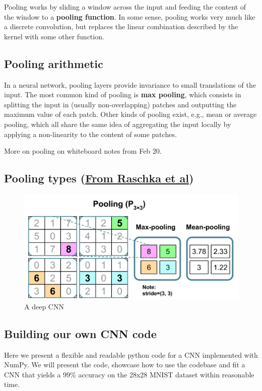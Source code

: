 \documentclass[%
oneside,                 %
final,                   %
10pt]{article}
\begin{document}
Pooling works by sliding a window across the input and feeding the content of
the window to a \textbf{pooling function}. In some sense, pooling works very much
like a discrete convolution, but replaces the linear combination described by
the kernel with some other function.

\subsection{Pooling arithmetic}

In a neural network, pooling layers provide invariance to small translations of
the input. The most common kind of pooling is \textbf{max pooling}, which
consists in splitting the input in (usually non-overlapping) patches and
outputting the maximum value of each patch. Other kinds of pooling exist, e.g.,
mean or average pooling, which all share the same idea of aggregating the input
locally by applying a non-linearity to the content of some patches.

More on pooling on whiteboard notes from Feb 20.

\subsection{Pooling types (\href{{https://github.com/rasbt/machine-learning-book}}{From Raschka et al})}

\begin{figure}[!ht]  %
  \centerline{\includegraphics[width=0.67\linewidth]{figslides/maxpooling.png}}
  \caption{
  A deep CNN
  }
\end{figure}

\subsection{Building our own CNN code}

Here we present a flexible and readable python code for a CNN
implemented with NumPy. We will present the code, showcase how to use
the codebase and fit a CNN that yields a 99\% accuracy on the 28x28
MNIST dataset within reasonable time.
\end{document}
